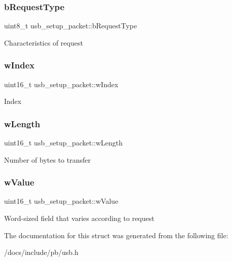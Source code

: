 \subsubsection{\texorpdfstring{b\+Request\+Type}{bRequestType}}
{\footnotesize\ttfamily uint8\+\_\+t usb\+\_\+setup\+\_\+packet\+::b\+Request\+Type}

Characteristics of request \mbox{\label{structusb__setup__packet_a953c058f0e31481a3d59b404037be009}} 
\subsubsection{\texorpdfstring{w\+Index}{wIndex}}
{\footnotesize\ttfamily uint16\+\_\+t usb\+\_\+setup\+\_\+packet\+::w\+Index}

Index \mbox{\label{structusb__setup__packet_a3421c921569bf3727534652c5f71da96}} 
\subsubsection{\texorpdfstring{w\+Length}{wLength}}
{\footnotesize\ttfamily uint16\+\_\+t usb\+\_\+setup\+\_\+packet\+::w\+Length}

Number of bytes to transfer \mbox{\label{structusb__setup__packet_a619fbc1b9b6452f4394da713bdbc6a89}} 
\subsubsection{\texorpdfstring{w\+Value}{wValue}}
{\footnotesize\ttfamily uint16\+\_\+t usb\+\_\+setup\+\_\+packet\+::w\+Value}

Word-\/sized field that varies according to request 

The documentation for this struct was generated from the following file\+:\begin{DoxyCompactItemize}
\item 
/docs/include/pb/usb.\+h\end{DoxyCompactItemize}
